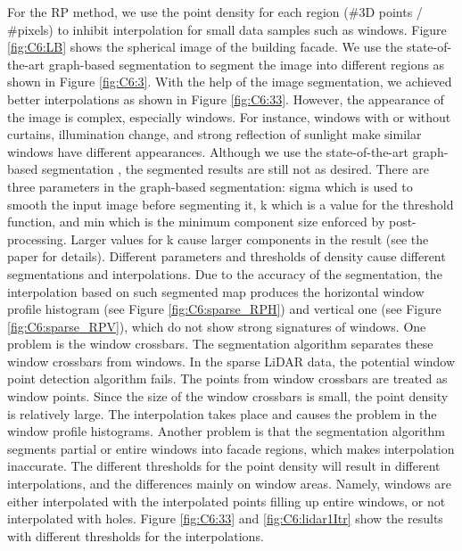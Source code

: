 For the RP method, we use the point density for each region (\#3D points / \#pixels) to inhibit interpolation for small data samples such as windows. Figure \ref{fig:C6:LB} shows the spherical image of the building facade. We use the state-of-the-art graph-based segmentation \cite{Felzenszwalb04} to segment 
the image into different regions as shown in Figure \ref{fig:C6:3}. With the help of the image segmentation, we achieved better interpolations as shown in Figure \ref{fig:C6:33}.
However, the appearance of the image is complex, especially windows. For instance, windows with or without curtains, illumination change, and strong reflection of sunlight make similar windows have different appearances. Although we use the state-of-the-art graph-based segmentation \cite{Felzenszwalb04}, the segmented results are still not as desired. There are three parameters in the graph-based segmentation: sigma which is used to smooth the input image before segmenting it, k which is a value for the threshold function, and min which is the minimum component size enforced by post-processing. Larger values for k cause larger components in the result (see the paper \cite{Felzenszwalb04} for details). Different parameters and thresholds of density cause different segmentations and interpolations. Due to the accuracy of the segmentation, the interpolation based on such segmented map produces the horizontal window profile histogram (see Figure \ref{fig:C6:sparse_RPH}) and vertical one (see Figure \ref{fig:C6:sparse_RPV}), which do not show strong signatures
of windows. One problem is the window crossbars. The segmentation algorithm separates these window crossbars from
windows. In the sparse LiDAR data, the potential window point
detection algorithm fails. The points from window crossbars are treated as window points. Since the size of the window crossbars is small, the point density is relatively large. The interpolation takes place and causes the problem in the window profile histograms. Another problem is that the segmentation algorithm segments partial or entire windows into facade regions, which makes interpolation inaccurate. The different thresholds for the point density will result in different interpolations, and the differences mainly on window areas. 
Namely, windows are either interpolated with the interpolated points filling up entire windows, or not interpolated with holes. Figure 
\ref{fig:C6:33} and \ref{fig:C6:lidar1Itr} show the results with different thresholds for the interpolations.

